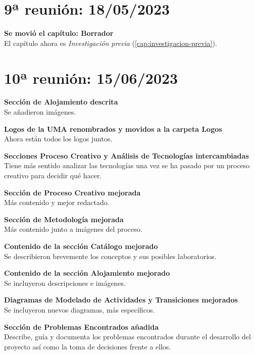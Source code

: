         \newpage

    \section{9ª reunión: 18/05/2023}

        \textbf{Se movió el capítulo: Borrador} \\
        El capítulo ahora es \textit{Investigación previa} (\ref{cap:investigacion-previa}).

        \newpage


    \section{10ª reunión: 15/06/2023}

        \textbf{Sección de Alojamiento descrita} \\
        Se añadieron imágenes.

        \textbf{Logos de la UMA renombrados y movidos a la carpeta Logos} \\
        Ahora están todos los logos juntos.

        \textbf{Secciones Proceso Creativo y Análisis de Tecnologías intercambiadas} \\
        Tiene más sentido analizar las tecnologías una vez se ha pasado por un proceso creativo para decidir qué hacer.

        \textbf{Sección de Proceso Creativo mejorada} \\
        Más contenido y mejor redactado.

        \textbf{Sección de Metodología mejorada} \\
        Más contenido junto a imágenes del proceso.

        \textbf{Contenido de la sección Catálogo mejorado} \\
        Se describieron brevemente los conceptos y sus posibles laboratorios.

        \textbf{Contenido de la sección Alojamiento mejorado} \\
        Se incluyeron descripciones e imágenes.

        \textbf{Diagramas de Modelado de Actividades y Transiciones mejorados} \\
        Se incluyeron nuevos diagramas, más específicos.

        \textbf{Sección de Problemas Encontrados añadida} \\
        Describe, guía y documenta los problemas encontrados durante el desarrollo del proyecto así como la toma de decisiones frente a ellos.
